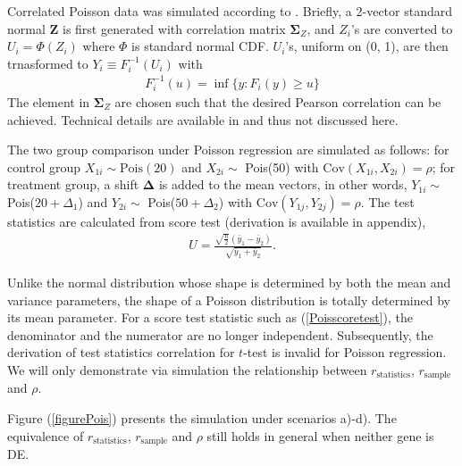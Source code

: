 \documentclass[11pt, a4paper]{article}
\begin{document}
Correlated Poisson data was simulated according to \cite{madsen2013simulating}. Briefly, a 2-vector standard normal $\bm Z$ is first generated with correlation matrix $\bm \Sigma_Z$, and $Z_i$'s are converted to $U_i= \Phi(Z_i)$ where $\Phi$ is standard normal CDF. $U_i$'s, uniform on (0, 1), are then trnasformed to $Y_i \equiv F_i^{-1}(U_i)$ with 
\begin{align}\label{inverseSim}
	F_i^{-1}(u) = \inf \{y: F_i(y)\geq u\}
\end{align}
The element in $\bm \Sigma_Z$ are chosen such that the desired Pearson correlation can be achieved. Technical details are available in \cite{madsen2013simulating} and thus not discussed here. 

The two group comparison under Poisson regression are simulated as follows: for control group $X_{1i} \sim \text{Pois}(20)$ and $X_{2i}\sim $ Pois(50)   with $\text{Cov}(X_{1i}, X_{2i}) = \rho$; for treatment group, a shift $\bm \Delta$ is added to the mean vectors, in other words, $Y_{1i} \sim $ Pois($20 + \Delta_1$) and $Y_{2i} \sim $ Pois($50 + \Delta_2$) with $\text{Cov}(Y_{1j}, Y_{2j}) = \rho$. The test statistics are calculated from score test (derivation is available in appendix),
\begin{align}\label{Poisscoretest}
	U = \frac{\sqrt{\frac{n}{2}}(\bar{y}_1- \bar{y}_2)}{\sqrt{\bar{y}_1 + \bar{y}_2}}.
\end{align}

Unlike the normal distribution whose shape is determined by both the mean and variance parameters, the shape of a Poisson distribution is totally determined by its mean parameter. For a score test statistic such as (\ref{Poisscoretest}), the denominator and the numerator are no longer independent. Subsequently, the derivation of test statistics correlation for $t$-test is invalid for Poisson regression. We will only demonstrate via simulation the relationship between  $r_\text{statistics}$, $r_{\text{sample}}$ and $\rho$.

Figure (\ref{figurePois}) presents the simulation under scenarios a)-d). The equivalence of $r_\text{statistics}$, $r_{\text{sample}}$ and $\rho$ still holds in general when neither gene is DE.  
\end{document}
